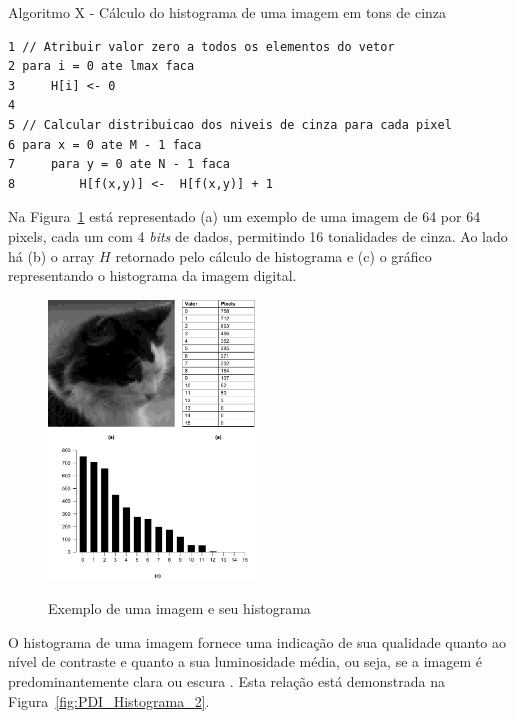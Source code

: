 \documentclass[12pt,oneside,a4paper,english,french,spanish,brazil,]{abntex2}
\begin{document}
\label{alg:Histograma}
Algoritmo X - Cálculo do histograma de uma imagem em tons de cinza
\begin{verbatim}
1 // Atribuir valor zero a todos os elementos do vetor
2 para i = 0 ate lmax faca
3     H[i] <- 0
4     
5 // Calcular distribuicao dos niveis de cinza para cada pixel
6 para x = 0 ate M - 1 faca
7     para y = 0 ate N - 1 faca
8         H[f(x,y)] <-  H[f(x,y)] + 1
\end{verbatim}

Na Figura~\ref{fig:PDI_Histograma} está representado (a) um exemplo de uma imagem de 64 por 64 pixels, cada um com 4 \textit{bits} de dados, permitindo 16 tonalidades de cinza. Ao lado há (b) o array \(H\) retornado pelo cálculo de histograma e (c) o gráfico representando o histograma da imagem digital.

\begin{figure}[ht]
\centering
\caption{Exemplo de uma imagem e seu histograma}
\includegraphics[width=0.5\textwidth]{imagens/PDI_Histograma.pdf}
\sourceAuthor
\label{fig:PDI_Histograma}
\end{figure}

O histograma de uma imagem fornece uma indicação de sua qualidade quanto ao nível de contraste e quanto a sua luminosidade média, ou seja, se a imagem é predominantemente clara ou escura \cite{conci:2003}. Esta relação está demonstrada na Figura~\ref{fig:PDI_Histograma_2}.
\end{document}
